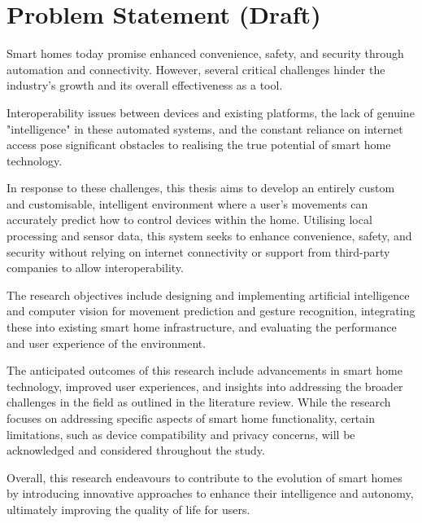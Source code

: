 \section{Problem Statement (Draft)}

Smart homes today promise enhanced convenience, safety, and security through automation and connectivity. However, several critical challenges hinder the industry's growth and its overall effectiveness as a tool.

Interoperability issues between devices and existing platforms, the lack of genuine "intelligence" in these automated systems, and the constant reliance on internet access pose significant obstacles to realising the true potential of smart home technology.

In response to these challenges, this thesis aims to develop an entirely custom and customisable, intelligent environment where a user's movements can accurately predict how to control devices within the home. Utilising local processing and sensor data, this system seeks to enhance convenience, safety, and security without relying on internet connectivity or support from third-party companies to allow interoperability.

The research objectives include designing and implementing artificial intelligence and computer vision for movement prediction and gesture recognition, integrating these into existing smart home infrastructure, and evaluating the performance and user experience of the environment.

The anticipated outcomes of this research include advancements in smart home technology, improved user experiences, and insights into addressing the broader challenges in the field as outlined in the literature review. While the research focuses on addressing specific aspects of smart home functionality, certain limitations, such as device compatibility and privacy concerns, will be acknowledged and considered throughout the study.

Overall, this research endeavours to contribute to the evolution of smart homes by introducing innovative approaches to enhance their intelligence and autonomy, ultimately improving the quality of life for users.
